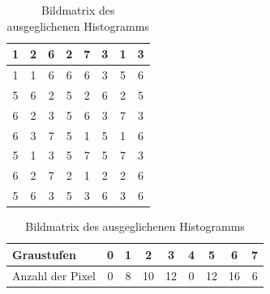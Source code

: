 \begin{table}[htb]
  \caption{Bildmatrix des ausgeglichenen Histogramms}
  \label{tab:hamatrix}
  \centering
  \begin{minipage}{\textwidth}
  \center
  \begin{tabular}{|c|c|c|c|c|c|c|c|}
  \hline
  1&2&6&2&7&3&1&3\\
  \hline
  1&1&6&6&6&3&5&6\\
  \hline
  5&6&2&5&2&6&2&5\\
  \hline
  6&2&3&5&6&3&7&3\\
  \hline
  6&3&7&5&1&5&1&6\\
  \hline
  5&1&3&5&7&5&7&3\\
  \hline
  6&2&7&2&1&2&2&6\\
  \hline
  5&6&3&5&3&6&3&6\\
  \hline
  \end{tabular}
  \end{minipage}
  \begin{minipage}{\textwidth}
  \hspace{\textwidth}
  \end{minipage}
  \begin{minipage}{\textwidth}
  \center
  \begin{tabular}{|l|c|c|c|c|c|c|c|c|}
  \hline
  Graustufen & 0 & 1 & 2 & 3 & 4 & 5 & 6 & 7\\
  \hline
  Anzahl der Pixel & 0 & 8 & 10 & 12 & 0 & 12 & 16 & 6\\
  \hline
  \end{tabular}
  \end{minipage}
  \end{table}
  \newpage
